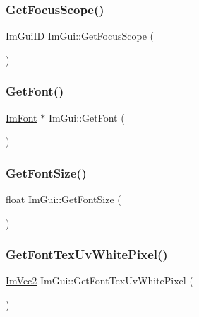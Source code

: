 \mbox{\label{namespaceImGui_a93594a26ea707a7edd0a80a7cbbcc324}} 
\subsubsection{\texorpdfstring{Get\+Focus\+Scope()}{GetFocusScope()}}
{\footnotesize\ttfamily Im\+Gui\+ID Im\+Gui\+::\+Get\+Focus\+Scope (\begin{DoxyParamCaption}{ }\end{DoxyParamCaption})\hspace{0.3cm}{\ttfamily [inline]}}

\mbox{\label{namespaceImGui_a43cf349576e20fac4a1300269320ad8f}} 
\subsubsection{\texorpdfstring{Get\+Font()}{GetFont()}}
{\footnotesize\ttfamily \hyperlink{structImFont}{Im\+Font} $\ast$ Im\+Gui\+::\+Get\+Font (\begin{DoxyParamCaption}{ }\end{DoxyParamCaption})}

\mbox{\label{namespaceImGui_ac592ae8e0aa4a1a06502ec7872bc8da8}} 
\subsubsection{\texorpdfstring{Get\+Font\+Size()}{GetFontSize()}}
{\footnotesize\ttfamily float Im\+Gui\+::\+Get\+Font\+Size (\begin{DoxyParamCaption}{ }\end{DoxyParamCaption})}

\mbox{\label{namespaceImGui_a3092da6abc1d04f3287c084435dc6026}} 
\subsubsection{\texorpdfstring{Get\+Font\+Tex\+Uv\+White\+Pixel()}{GetFontTexUvWhitePixel()}}
{\footnotesize\ttfamily \hyperlink{structImVec2}{Im\+Vec2} Im\+Gui\+::\+Get\+Font\+Tex\+Uv\+White\+Pixel (\begin{DoxyParamCaption}{ }\end{DoxyParamCaption})}

